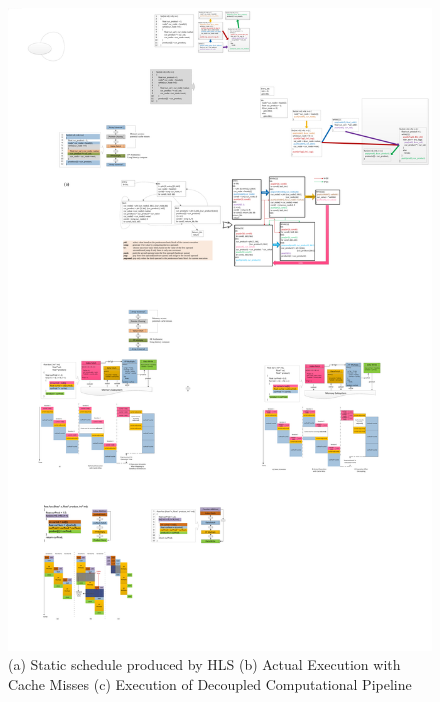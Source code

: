 \begin{figure}[htp]
\begin{center}
\includegraphics[width=1.0\linewidth]{chap3fig/schedules.pdf}
\caption{(a) Static schedule produced by HLS (b) Actual Execution with Cache Misses (c) Execution of Decoupled Computational Pipeline 
\label{fig:sche}}
\end{center}
\end{figure}

